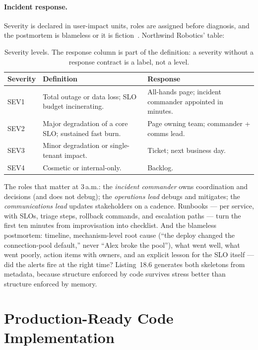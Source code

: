 \paragraph{Incident response.} Severity is declared in user-impact units,
roles are assigned before diagnosis, and the postmortem is blameless or it
is fiction~\cite{beyer2016sre}. Northwind Robotics' table:

\begin{table}[ht]
  \centering
  \small
  \begin{tabularx}{\textwidth}{l X l}
    \toprule
    \textbf{Severity} & \textbf{Definition} & \textbf{Response} \\
    \midrule
    SEV1 & Total outage or data loss; SLO budget incinerating. & All-hands page; incident commander appointed in minutes. \\
    SEV2 & Major degradation of a core SLO; sustained fast burn. & Page owning team; commander + comms lead. \\
    SEV3 & Minor degradation or single-tenant impact. & Ticket; next business day. \\
    SEV4 & Cosmetic or internal-only. & Backlog. \\
    \bottomrule
  \end{tabularx}
  \caption{Severity levels. The response column is part of the definition:
  a severity without a response contract is a label, not a level.}
  \label{tab:ch18-severity}
\end{table}

The roles that matter at 3\,a.m.: the \emph{incident commander} owns
coordination and decisions (and does not debug); the \emph{operations lead}
debugs and mitigates; the \emph{communications lead} updates stakeholders
on a cadence. Runbooks --- per service, with SLOs, triage steps, rollback
commands, and escalation paths --- turn the first ten minutes from
improvisation into checklist. And the blameless postmortem: timeline,
mechanism-level root cause (``the deploy changed the connection-pool
default,'' never ``Alex broke the pool''), what went well, what went
poorly, action items with owners, and an explicit lesson for the SLO
itself --- did the alerts fire at the right time? Listing~18.6 generates
both skeletons from metadata, because structure enforced by code survives
stress better than structure enforced by memory.
\section{Production-Ready Code Implementation}
\label{sec:ch18-code}

